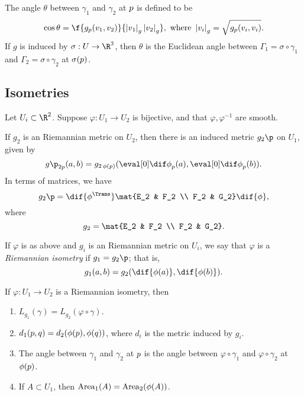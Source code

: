 
The angle $\theta$ between $\gamma_1$ and $\gamma_2$ at $p$ is defined to be
\begin{equation*}
	\cos\theta = \f{g_\pp(\vv_1,\vv_2)}{\left\vert \vv_1 \right\vert_g \left\vert \vv_2 \right\vert_g}, \text{ where } \left\vert \vv_i \right\vert_g = \sqrt{g_\pp(\vv_i,\vv_i)}.
\end{equation*}
If $g$ is induced by $\sigma:U\to\R^3$, then $\theta$ is the Euclidean angle between $\Gamma_1=\sigma\circ\gamma_1$ and $\Gamma_2=\sigma\circ\gamma_2$ at $\sigma(p)$.


	\pagebreak

\subsection{Isometries} %
\label{sub:riemannian_isometries}

Let $U_i\subset\R^2$. Suppose $\varphi:U_1\to U_2$ is bijective, and that $\varphi,\varphi^{-1}$ are smooth.

If $g_2$ is an Riemannian metric on $U_2$, then there is an induced metric $g_2\p$ on $U_1$, given by
\begin{equation*}
	g\p_{2\pp}(\va,\vb) = g_{2\,\varphi(\pp)} (\ddif{\varphi}{\pp}(\va), \ddif{\varphi}{\pp}(\vb)).
\end{equation*}
In terms of matrices, we have
\begin{equation*}
	g_2\p = \dif{\varphi^\Trans} \mat{E_2 & F_2 \\ F_2 & G_2} \dif{\varphi},
\end{equation*}
where
\begin{equation*}
	g_2 = \mat{E_2 & F_2 \\ F_2 & G_2}.
\end{equation*}

\begin{definition}
	If $\varphi$ is as above and $g_i$ is an Riemannian metric on $U_i$, we say that $\varphi$ is a \emph{Riemannian isometry} if $g_1 = g_2\p$; that is,
	\begin{equation*}
		g_1(\va,\vb) = g_2(\dif{\varphi(\va)}, \dif{\varphi(\vb)}).
	\end{equation*}
\end{definition}

\begin{proposition}
	If  $\varphi:U_1 \to U_2$ is a Riemannian isometry, then
	\begin{enumerate}
		\shortskip
		\item $L_{g_1}(\gamma) = L_{g_2}(\varphi \circ \gamma)$.
		\item $d_1(p,q) = d_2(\phi(p),\phi(q))$, where $d_i$ is the metric induced by $g_i$.
		\item The angle between $\gamma_1$ and $\gamma_2$ at $p$ is the angle between $\varphi\circ \gamma_1$ and $\varphi\circ\gamma_2$ at $\phi(p)$.
		\item If $A\subset U_1$, then $\operatorname{Area}_1(A) = \operatorname{Area}_2(\phi(A))$.
	\end{enumerate}
\end{proposition}

